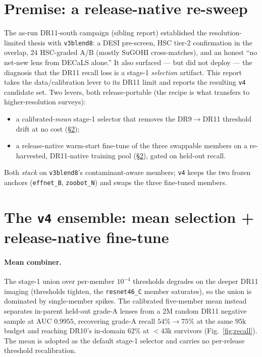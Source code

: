 \documentclass[11pt,letterpaper]{article}
\newcommand{\vb}{\texttt{v3blend8}}
\newcommand{\vc}{\texttt{v4}}
\begin{document}
\section{Premise: a release-native re-sweep}
\label{sec:premise}
The as-run DR11-south campaign (sibling report) established the resolution-limited thesis with \vb{}: a
DESI pre-screen, HSC tier-2 confirmation in the overlap, $24$ HSC-graded A/B (mostly SuGOHI
cross-matches), and an honest ``no net-new lens from DECaLS alone.'' It also surfaced --- but did not
deploy --- the diagnosis that the DR11 recall loss is a stage-1 \emph{selection} artifact. This report
takes the data/calibration lever to its DR11 limit and reports the resulting \vc{} candidate set. Two
levers, both release-portable (the recipe is what transfers to higher-resolution surveys):
\begin{itemize}
  \item a calibrated-\emph{mean} stage-1 selector that removes the DR9$\to$DR11 threshold drift at no
  cost (\S\ref{sec:ensemble});
  \item a release-native warm-start fine-tune of the three swappable members on a re-harvested,
  DR11-native training pool (\S\ref{sec:ensemble}), gated on held-out recall.
\end{itemize}
Both \emph{stack} on \vb{}'s contaminant-aware members; \vc{} keeps the two frozen anchors
(\texttt{effnet\_B}, \texttt{zoobot\_N}) and swaps the three fine-tuned members.

\section{The \vc{} ensemble: mean selection + release-native fine-tune}
\label{sec:ensemble}
\paragraph{Mean combiner.} The stage-1 union over per-member $10^{-4}$ thresholds degrades on the deeper
DR11 imaging (thresholds tighten, the \texttt{resnet46\_C} member saturates), so the union is dominated
by single-member spikes. The calibrated five-member mean instead separates in-parent held-out grade-A
lenses from a $2$M random DR11 negative sample at AUC $0.9955$, recovering grade-A recall $54\%\!\to\!75\%$
at the same $95$k budget and reaching DR10's in-domain $62\%$ at $<\!43$k survivors (Fig.~\ref{fig:recall}).
The mean is adopted as the default stage-1 selector and carries no per-release threshold recalibration.
\end{document}
